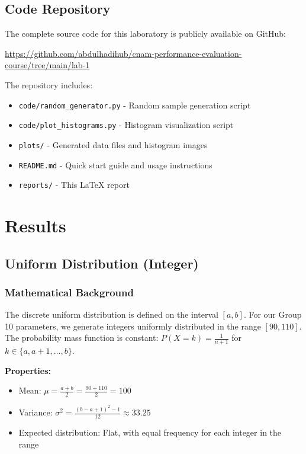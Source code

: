 \documentclass[12pt]{article}
\begin{document}
\subsection{Code Repository}

The complete source code for this laboratory is publicly available on GitHub:

\begin{center}
    \url{https://github.com/abdulhadihub/cnam-performance-evaluation-course/tree/main/lab-1}
\end{center}

The repository includes:
\begin{itemize}
    \item \texttt{code/random\_generator.py} - Random sample generation script
    \item \texttt{code/plot\_histograms.py} - Histogram visualization script
    \item \texttt{plots/} - Generated data files and histogram images
    \item \texttt{README.md} - Quick start guide and usage instructions
    \item \texttt{reports/} - This LaTeX report
\end{itemize}

\section{Results}

\subsection{Uniform Distribution (Integer)}

\subsubsection{Mathematical Background}

The discrete uniform distribution is defined on the interval $[a, b]$. For our Group 10 parameters, we generate integers uniformly distributed in the range $[90, 110]$. The probability mass function is constant: $P(X = k) = \frac{1}{n+1}$ for $k \in \{a, a+1, \ldots, b\}$.

\textbf{Properties:}
\begin{itemize}
    \item Mean: $\mu = \frac{a + b}{2} = \frac{90 + 110}{2} = 100$
    \item Variance: $\sigma^2 = \frac{(b-a+1)^2 - 1}{12} \approx 33.25$
    \item Expected distribution: Flat, with equal frequency for each integer in the range
\end{itemize}
\end{document}
